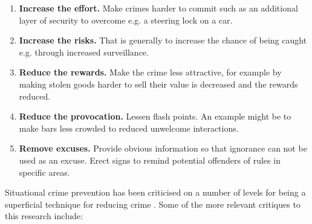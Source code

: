 \begin{enumerate}
\begin{enumerate}
\item{\bf{Increase the effort.}} Make crimes harder to commit such as an additional layer of security to overcome e.g. a steering lock on a car.
\item{\bf{Increase the risks.} }That is generally to increase the chance of being caught e.g. through increased surveillance.
\item{\bf{Reduce the rewards.}} Make the crime less attractive, for example by making stolen goods harder to sell  their value is decreased and the rewards reduced.
\item{\bf{Reduce the provocation.}} Lessen flash points. An example might be to make bars less crowded to reduced unwelcome interactions.
\item{\bf{Remove excuses.}} Provide obvious information so that ignorance can not be used as an excuse. Erect signs to remind potential offenders of rules in specific areas. 
\end{enumerate}

\end{enumerate}


Situational crime prevention has been criticised on a number of levels for being a superficial technique for reducing crime \parencite{wortley2010critiques}. Some of the more relevant critiques to this research include:

